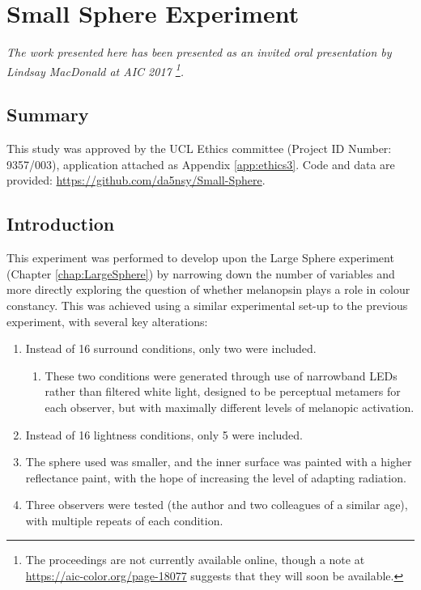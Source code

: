 \chapter{Small Sphere Experiment}
\label{chap:SmallSphere}

\textit{The work presented here has been presented as an invited oral presentation by Lindsay MacDonald at AIC 2017 \citep{macdonald_melanopsin_2017}\footnote{The proceedings are not currently available online, though a note at \url{https://aic-color.org/page-18077} suggests that they will soon be available.}.}


\section{Summary}

This study was approved by the \gls{UCL} Ethics committee (Project ID Number: 9357/003), application attached as Appendix \ref{app:ethics3}. Code and data are provided: \url{https://github.com/da5nsy/Small-Sphere}.

\section{Introduction}


This experiment was performed to develop upon the Large Sphere experiment (Chapter \ref{chap:LargeSphere}) by narrowing down the number of variables and more directly exploring the question of whether melanopsin plays a role in colour constancy. This was achieved using a similar experimental set-up to the previous experiment, with several key alterations:

\begin{enumerate}
    \item Instead of 16 surround conditions, only two were included.
    \begin{enumerate}
        \item These two conditions were generated through use of narrowband LEDs rather than filtered white light, designed to be perceptual metamers for each observer, but with maximally different levels of melanopic activation.
    \end{enumerate}
    \item Instead of 16 lightness conditions, only 5 were included.
    \item The sphere used was smaller, and the inner surface was painted with a higher reflectance paint, with the hope of increasing the level of adapting radiation.
    \item Three observers were tested (the author and two colleagues of a similar age), with multiple repeats of each condition.
\end{enumerate}

